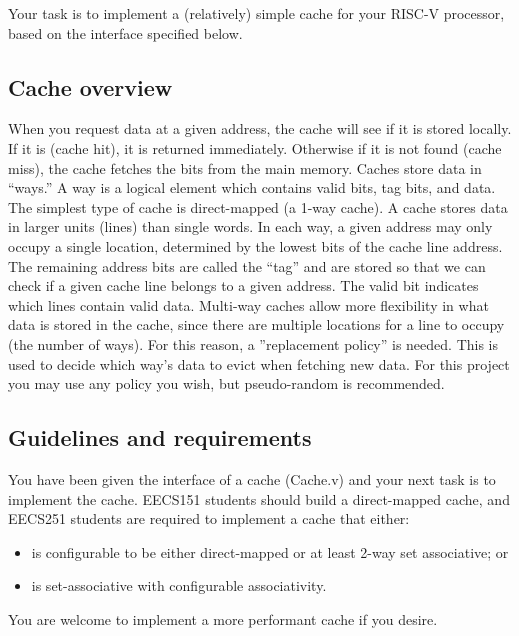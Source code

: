 \documentclass[11pt]{article}
\begin{document}
Your task is to implement a (relatively) simple cache for your RISC-V processor, based on the interface specified below.

\subsection{Cache overview}
When you request data at a given address, the cache will see if it is stored locally. If it is (cache hit), it is returned immediately. Otherwise if it is not found (cache miss), the cache fetches the bits from the main memory. Caches store data in “ways.” A way is a logical element which contains valid bits, tag bits, and data. The simplest type of cache is direct-mapped (a 1-way cache). A cache stores data in larger units (lines) than single words. In each way, a given address may only occupy a single location, determined by the lowest bits of the cache line address. The remaining address bits are called the “tag” and are stored so that we can check if a given cache line belongs to a given address. The valid bit indicates which lines contain valid data. Multi-way caches allow more flexibility in what data is stored in the cache, since there are multiple locations for a line to occupy (the number of ways). For this reason, a ”replacement policy” is needed. This is used to decide which way’s data to evict when fetching new data. For this project you may use any policy you wish, but pseudo-random is recommended.

\subsection{Guidelines and requirements}
You have been given the interface of a cache (Cache.v) and your next task is to implement the cache. EECS151 students should build a direct-mapped cache, and EECS251 students are required to implement a cache that either:

\begin{itemize}
    \item is configurable to be either direct-mapped or at least 2-way set associative; or
    \item is set-associative with configurable associativity.
\end{itemize}

You are welcome to implement a more performant cache if you desire. %
\end{document}

